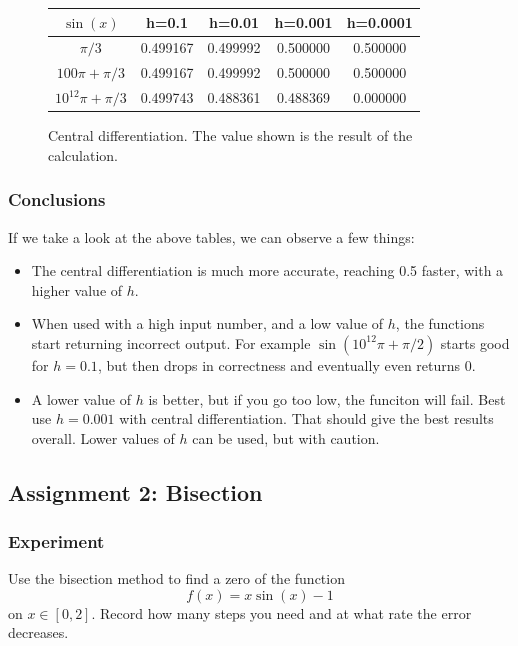 \documentclass[a4paper,10pt]{article}
\begin{document}
  \begin{figure}[H]
 
    \begin{tabular}{|c|c|c|c|c|}
      \hline
      \textbf{$\sin(x)$} & h=0.1 & h=0.01 & h=0.001 & h=0.0001\\
      \hline
      \hline
      $\pi/3$ & 0.499167 & 0.499992 & 0.500000 & 0.500000\\
      \hline
      $100\pi + \pi/3$ & 0.499167 & 0.499992 & 0.500000 & 0.500000\\
      \hline
      $10^{12} \pi + \pi/3$ & 0.499743 & 0.488361 & 0.488369 & 0.000000\\
      \hline
    \end{tabular}
    \caption{Central differentiation. The value shown is the result of the calculation.}
  \end{figure}

  \subsubsection{Conclusions}
    If we take a look at the above tables, we can observe a few things:
    \begin{itemize}
      \item The central differentiation is much more accurate, reaching 0.5 faster, with a higher value of $h$.
      \item When used with a high input number, and a low value of $h$, the functions start returning incorrect output. For example $\sin(10^{12} \pi + \pi/2)$ starts good for $h = 0.1$, but then drops in correctness and eventually even returns $0$.
      \item A lower value of $h$ is better, but if you go too low, the funciton will fail. Best use $h=0.001$ with central differentiation. That should give the best results overall. Lower values of $h$ can be used, but with caution.
    \end{itemize}

  \subsection{Assignment 2: Bisection}

  \subsubsection{Experiment}
  Use the bisection method to find a zero of the function
                                          $$f(x) = x \sin(x) - 1$$
  on $x \in [0, 2]$.
  Record how many steps you need and at what rate the error decreases.
  
\end{document}
